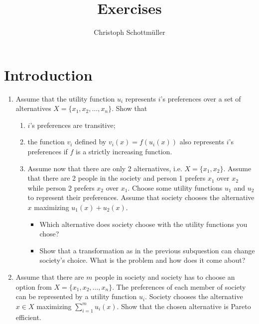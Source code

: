 \documentclass[a4paper]{article}
\author{Christoph Schottmüller}
\date{}
\title{Exercises}
\begin{document}
\maketitle

\section{Introduction}
\label{sec:org214ddde}
\begin{enumerate}
\item Assume that the utility function \(u_i\) represents \(i\)'s preferences over a set of alternatives \(X=\{x_1,x_2,\dots,x_n\}\). Show that
\begin{enumerate}
\item \(i\)'s preferences are transitive;
\item the function \(v_i\) defined by \(v_i(x)=f(u_i(x))\) also represents \(i\)'s preferences if \(f\) is a strictly increasing function.
\item Assume now that there are only 2 alternatives, i.e. \(X=\{x_1,x_2\}\). Assume that there are 2 people in the society and person 1 prefers \(x_1\) over \(x_2\) while person 2 prefers \(x_2\) over \(x_1\). Choose some utility functions \(u_1\) and \(u_2\) to represent their preferences. Assume that society chooses the alternative \(x\) maximizing \(u_1(x)+u_2(x)\). 
\begin{itemize}
\item Which alternative does society choose with the utility functions you chose?
\item Show that a transformation as in the previous subquestion can change society's choice. What is the problem and how does it come about?
\end{itemize}
\end{enumerate}

\item Assume that there are \(m\) people in society and society has to choose an option from  \(X=\{x_1,x_2,\dots,x_n\}\). The preferences of each member of society can be represented by a utility function \(u_i\). Society chooses the alternative \(x\in X\) maximizing \(\sum_{i=1}^m u_i(x)\). Show that the chosen alternative is Pareto efficient.


\end{enumerate}
\end{document}
